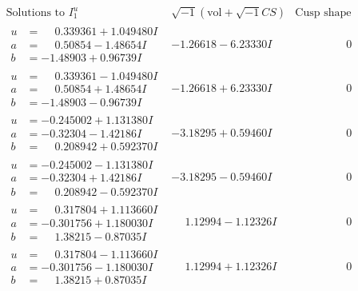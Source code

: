 \documentclass[1p]{elsarticle_modified}
\theoremstyle{definition}
\newcommand{\I}{\sqrt{-1}}
\begin{document}
$$\begin{array}{c|c|c}  
\text{Solutions to }I^u_{1}& \I (\text{vol} + \sqrt{-1}CS) & \text{Cusp shape}\\
 \hline 
\begin{aligned}
u &= \phantom{-}0.339361 + 1.049480 I \\
a &= \phantom{-}0.50854 - 1.48654 I \\
b &= -1.48903 + 0.96739 I\end{aligned}
 & -1.26618 - 6.23330 I & \phantom{-0.000000 } 0 \\ \hline\begin{aligned}
u &= \phantom{-}0.339361 - 1.049480 I \\
a &= \phantom{-}0.50854 + 1.48654 I \\
b &= -1.48903 - 0.96739 I\end{aligned}
 & -1.26618 + 6.23330 I & \phantom{-0.000000 } 0 \\ \hline\begin{aligned}
u &= -0.245002 + 1.131380 I \\
a &= -0.32304 - 1.42186 I \\
b &= \phantom{-}0.208942 + 0.592370 I\end{aligned}
 & -3.18295 + 0.59460 I & \phantom{-0.000000 } 0 \\ \hline\begin{aligned}
u &= -0.245002 - 1.131380 I \\
a &= -0.32304 + 1.42186 I \\
b &= \phantom{-}0.208942 - 0.592370 I\end{aligned}
 & -3.18295 - 0.59460 I & \phantom{-0.000000 } 0 \\ \hline\begin{aligned}
u &= \phantom{-}0.317804 + 1.113660 I \\
a &= -0.301756 + 1.180030 I \\
b &= \phantom{-}1.38215 - 0.87035 I\end{aligned}
 & \phantom{-}1.12994 - 1.12326 I & \phantom{-0.000000 } 0 \\ \hline\begin{aligned}
u &= \phantom{-}0.317804 - 1.113660 I \\
a &= -0.301756 - 1.180030 I \\
b &= \phantom{-}1.38215 + 0.87035 I\end{aligned}
 & \phantom{-}1.12994 + 1.12326 I & \phantom{-0.000000 } 0 \\ \hline\begin{aligned}

\end{aligned}
\end{array}$$
\end{document}
